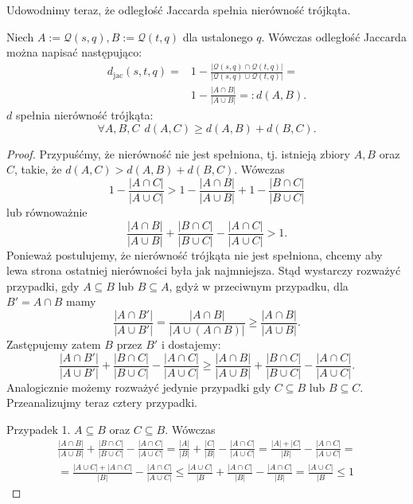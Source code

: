 \documentclass{praca1}
\begin{document}
Udowodnimy teraz, że odległość Jaccarda spełnia nierówność trójkąta.

\begin{lemma}
Niech $A := \mathcal{Q}(s,q), B:= \mathcal{Q}(t,q)$ dla ustalonego $q$. Wówczas odległość Jaccarda można napisać następująco:
\begin{align*}
d_{\mathrm{jac}}(s,t,q) = & 1 - \frac{|\mathcal{Q}(s,q) \cap \mathcal{Q}(t,q)|}{|\mathcal{Q}(s,q) \cup \mathcal{Q}(t,q)|} = \\ & 1 - \frac{|A\cap B|}{|A\cup B|}= :d(A, B).
\end{align*}
$d$ spełnia nierówność trójkąta:
$$
\forall A, B, C\ \ d(A, C) \geq d(A,B) + d(B, C).
$$
\end{lemma}

\begin{proof}
Przypuśćmy, że nierówność nie jest spełniona, tj. istnieją zbiory $A, B$ oraz $C$, takie, że $ d(A, C) > d(A,B) + d(B, C)$. Wówczas
$$
1 - \frac{|A\cap C|}{|A\cup C|} > 1 - \frac{|A\cap B|}{|A\cup B|} + 1 - \frac{|B\cap C|}{|B\cup C|}
$$
lub równoważnie
\begin{equation}
\label{eq:015}
\frac{|A\cap B|}{|A\cup B|} + \frac{|B\cap C|}{|B\cup C|} - \frac{|A\cap C|}{|A\cup C|} > 1.
\end{equation}
Ponieważ postulujemy, że nierówność trójkąta nie jest spełniona, chcemy aby lewa strona ostatniej nierówności była jak najmniejsza. Stąd wystarczy rozważyć przypadki, gdy $A \subseteq B$ lub $B \subseteq A$, gdyż w przeciwnym przypadku, dla $B' = A\cap B$ mamy
$$
\frac{|A\cap B'|}{|A\cup B'|} = \frac{|A\cap B|}{|A\cup (A \cap B)|} \geq \frac{|A\cap B|}{|A\cup B|}.
$$
Zastępujemy zatem $B$ przez $B'$ i dostajemy:
$$
\frac{|A\cap B'|}{|A\cup B'|} + \frac{|B\cap C|}{|B\cup C|} - \frac{|A\cap C|}{|A\cup C|} \geq \frac{|A\cap B|}{|A\cup B|} + \frac{|B\cap C|}{|B\cup C|} - \frac{|A\cap C|}{|A\cup C|}.
$$
Analogicznie możemy rozważyć jedynie przypadki gdy $C \subseteq B$ lub $B \subseteq C$. Przeanalizujmy teraz cztery przypadki.

Przypadek 1. $A\subseteq B$ oraz $C \subseteq B$. Wówczas
\begin{multline*}
\frac{|A\cap B|}{|A\cup B|} + \frac{|B\cap C|}{|B\cup C|} - \frac{|A\cap C|}{|A\cup C|} = 
\frac{|A|}{|B|} + \frac{|C|}{|B|} - \frac{|A\cap C|}{|A\cup C|} =
\frac{|A| + |C|}{|B|} - \frac{|A\cap C|}{|A\cup C|} =\\
= \frac{|A\cup C| + |A\cap C|}{|B|} - \frac{|A\cap C|}{|A\cup C|} \leq 
\frac{|A\cup C|}{|B} + \frac{|A\cap C|}{|B|} - \frac{|A\cap C|}{|B|} = 
\frac{|A\cup C|}{|B}  \leq 1
\end{multline*}


\end{proof}
\end{document}
